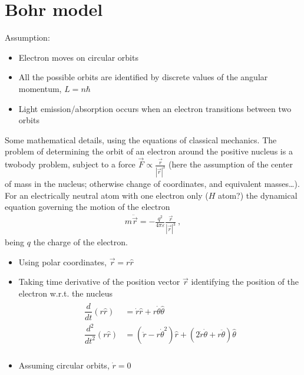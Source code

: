 \documentclass[letterpaper,10pt,english]{jupyterBook}
\begin{document}
\section{Bohr model}
\label{\detokenize{ch/quantum-mechanics/atom-models/bohr:bohr-model}}\label{\detokenize{ch/quantum-mechanics/atom-models/bohr:quantum-mechanics-atom-models-bohr}}\label{\detokenize{ch/quantum-mechanics/atom-models/bohr::doc}}
\sphinxAtStartPar
Assumption:
\begin{itemize}
\item {} 
\sphinxAtStartPar
Electron moves on circular orbits

\item {} 
\sphinxAtStartPar
All the possible orbits are identified by discrete values of the angular momentum, \(L = n \hbar\)

\item {} 
\sphinxAtStartPar
Light emission/absorption occurs when an electron transitions between two orbits

\end{itemize}

\sphinxAtStartPar
Some mathematical details, using the equations of classical mechanics. The problem of determining the orbit of an electron around the positive nucleus is a two\sphinxhyphen{}body problem, subject to a force \(\vec{F} \propto \frac{\vec{r}}{|\vec{r}|^3}\) (here the assumption of the center of mass in the nucleus; otherwise change of coordinates, and equivalent masses…). For an electrically neutral atom with one electron only (\(H\) atom?) the dynamical equation governing the motion of the electron
\begin{equation*}
\begin{split}m \ddot{\vec{r}} = - \frac{q^2}{4 \pi \varepsilon} \frac{\vec{r}}{|\vec{r}|^3} \ ,\end{split}
\end{equation*}
\sphinxAtStartPar
being \(q\) the charge of the electron.
\begin{itemize}
\item {} 
\sphinxAtStartPar
Using polar coordinates, \(\vec{r} = r \hat{r}\)

\item {} 
\sphinxAtStartPar
Taking time derivative of the position vector \(\vec{r}\) identifying the position of the electron w.r.t. the nucleus
\begin{equation*}
\begin{split}\begin{aligned}
     \dfrac{d}{dt} \left( r \hat{r} \right ) & = \dot{r} \hat{r} + r \dot{\theta} \hat{\theta} \\
     \dfrac{d^2}{dt^2} \left( r \hat{r} \right ) & = \left( \ddot{r} - r \dot{\theta}^2 \right) \hat{r} +  \left( 2 \dot{r} \dot{\theta} + r \ddot{\theta} \right) \hat{\theta} \\
   \end{aligned}\end{split}
\end{equation*}
\item {} 
\sphinxAtStartPar
Assuming circular orbits, \(\dot{r} = 0\)

\end{itemize}
\end{document}
